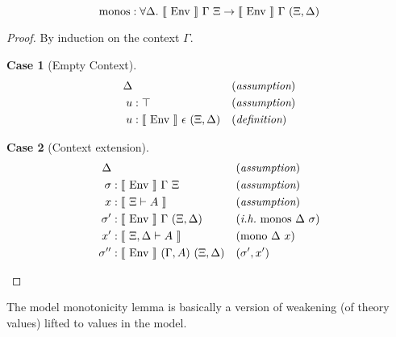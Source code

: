\documentclass{llncs}
\newtheorem{lcase}{Case}
\def\marr{\rightarrow}
\def\emp{\epsilon}
\def\mono{\fun{mono}}
\def\monos{\fun{monos}}
\def\bydef{(\textit{definition})}
\def\byass{(\textit{assumption})}
\newcommand{\ih}[1]{(\textit{i.h.}~ #1)}
\newcommand{\by}[1]{(#1)}
\newcommand{\all}[1]{\forall#1.~}
\newcommand{\el}[1]{\llbracket ~ #1 ~ \rrbracket}
\newcommand{\fun}[1]{\textmd{#1}}
\newcommand{\xtypm}[1]{\el{\Xi \vdash #1}}
\newcommand{\xdtypm}[1]{\el{\Xi, \Delta \vdash #1}}
\newcommand{\gmenv}[1]{\el{\fun{Env}}~\Gamma~#1}
\newcommand{\cmenv}[2]{\el{\fun{Env}}~#1~#2}
\begin{document}
\begin{lemma}
\label{lem:mod:monos}
$$
\monos : \all{\Delta} \gmenv{\Xi} \marr \gmenv{(\Xi, \Delta)}
$$

\begin{proof}
By induction on the context $\Gamma$.

\begin{lcase}[Empty Context]
\begin{align*}
\Delta& && \byass\\
u &: \top && \byass\\
u &: \cmenv{\emp}{(\Xi, \Delta)} && \bydef
\end{align*}
\end{lcase}

\begin{lcase}[Context extension]
\begin{align*}
\Delta& && \byass\\
\sigma &: \gmenv{\Xi} && \byass\\
x    &: \xtypm{A} && \byass\\
\sigma'  &: \gmenv{(\Xi, \Delta)} && \ih{\monos~\Delta~\sigma}\\
x'   &: \xdtypm{A} && \by{\mono~\Delta~x}\\
\sigma'' &: \cmenv{(\Gamma, A)}{(\Xi, \Delta)} && \by{\sigma', x'}
\end{align*}
\end{lcase}

\end{proof}

\end{lemma}

The model monotonicity lemma is basically a version of weakening (of
theory values) lifted to values in the model. 
\end{document}
